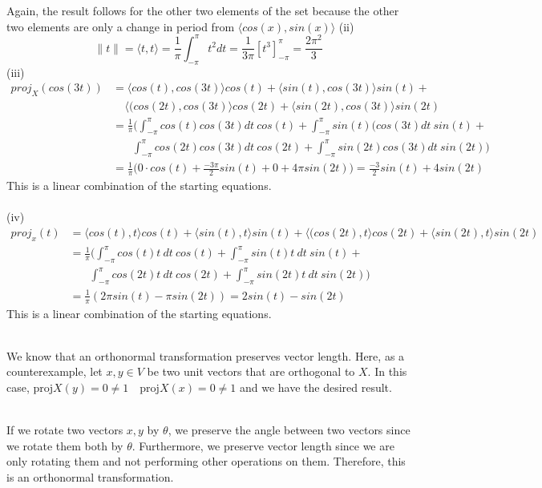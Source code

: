 \documentclass[letterpaper,12pt]{article}
\theoremstyle{definition}
\begin{document}
Again, the result follows for the other two elements of the set because the other two elements are only a change in period from $\langle cos(x),sin(x) \rangle$
(ii)\\
\[\|t\| = \langle  t,t \rangle   = \frac{1}{\pi}\int_{-\pi}^{\pi}t^2dt = \frac{1}{3\pi}[t^3]^\pi_{-\pi}=\frac{2\pi^2}{3}\]
(iii)\\
\begin{align*}
proj_X(cos(3t)) &= \langle  cos(t),cos(3t)\rangle   cos(t)+\langle  sin(t),cos(3t)\rangle   sin(t)+\\ 
&~~~~~\langle  (cos(2t),cos(3t)\rangle   cos(2t) +\langle  sin(2t),cos(3t)\rangle   sin(2t)\\
&=\frac{1}{\pi}\bigg(\int^\pi_{-\pi}cos(t)cos(3t)dt ~cos(t)+\int^\pi_{-\pi}sin(t)(cos(3t)dt ~sin(t)+\\ 
&~~~~~~~~\int^\pi_{-\pi}cos(2t)cos(3t)dt~cos(2t)+ \int^\pi_{-\pi}sin(2t)cos(3t)dt~sin(2t)\bigg)\\
&=\frac{1}{\pi}\big(0 \cdot cos(t)+\frac{-3\pi}{2}sin(t)+0+4\pi sin(2t)\big)=\frac{-3}{2}sin(t)+ 4sin(2t)
\end{align*}
This is a linear combination of the starting equations.\\ \\
(iv)\\
\begin{align*}
proj_{x}(t) &= \langle cos(t),t\rangle cos(t)+\langle  sin(t),t\rangle sin(t) + \langle  (cos(2t),t\rangle   cos(2t) +\langle  sin(2t),t\rangle   sin(2t)\\
&=\frac{1}{\pi}\bigg(\int^\pi_{-\pi}cos(t)t~dt ~cos(t)+\int^\pi_{-\pi}sin(t)t~dt ~sin(t)+\\ 
&~~~~~~~~\int^\pi_{-\pi}cos(2t)t~dt~cos(2t)+ \int^\pi_{-\pi}sin(2t)t~dt~sin(2t)\bigg) \\
&=\frac{1}{\pi}(2\pi sin(t)-\pi sin(2t))=2sin(t)-sin(2t)
\end{align*}
This is a linear combination of the starting equations.

\\

We know that an orthonormal transformation preserves vector length. Here, as a counterexample, let $x,y \in V$ be two unit vectors that are orthogonal to $X$. In this case, $\text{proj}X(y)= 0 \neq 1 \quad \text{proj}X(x)= 0 \neq 1 $ and we have the desired result. 

\\

If we rotate two vectors $x,y$ by $\theta$, we preserve the angle between two vectors since we rotate them both by $\theta$. Furthermore, we preserve vector length since we are only rotating them and not performing other operations on them. Therefore, this is an orthonormal transformation.
\end{document}
